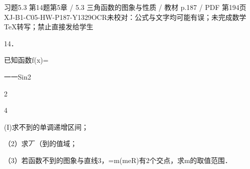 \begin{bankitem}{习题5.3 第14题}{第5章 / 5.3 三角函数的图象与性质 / 教材 p.187 / PDF 第194页}{XJ-B1-C05-HW-P187-Y1329}{OCR未校对：公式与文字均可能有误；未完成数学TeX转写；禁止直接发给学生}
\begin{ocrdraft}
\par
14．
\par
已知函数f(x)=
\par
一一Sin2
\par
2
\par
4
\par
(I)求不到的单调递增区间；
\par
（2）求丆（到的值域；
\par
（3）若函数不到的图象与直线3，=m(meR)有2个交点，求m的取值范围．
\end{ocrdraft}
\end{bankitem}
